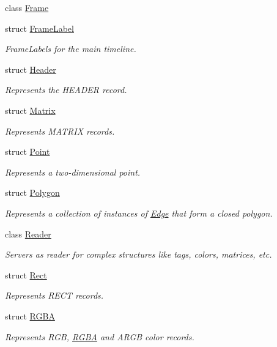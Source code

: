 \begin{DoxyCompactItemize}
class \hyperlink{classjswf_1_1flash_1_1_frame}{Frame}
\item 
struct \hyperlink{structjswf_1_1flash_1_1_frame_label}{Frame\+Label}
\begin{DoxyCompactList}\small\item\em Frame\+Labels for the main timeline. \end{DoxyCompactList}\item 
struct \hyperlink{structjswf_1_1flash_1_1_header}{Header}
\begin{DoxyCompactList}\small\item\em Represents the {\ttfamily H\+E\+A\+D\+E\+R} record. \end{DoxyCompactList}\item 
struct \hyperlink{structjswf_1_1flash_1_1_matrix}{Matrix}
\begin{DoxyCompactList}\small\item\em Represents {\ttfamily M\+A\+T\+R\+I\+X} records. \end{DoxyCompactList}\item 
struct \hyperlink{structjswf_1_1flash_1_1_point}{Point}
\begin{DoxyCompactList}\small\item\em Represents a two-\/dimensional point. \end{DoxyCompactList}\item 
struct \hyperlink{structjswf_1_1flash_1_1_polygon}{Polygon}
\begin{DoxyCompactList}\small\item\em Represents a collection of instances of \hyperlink{structjswf_1_1flash_1_1_edge}{Edge} that form a closed polygon. \end{DoxyCompactList}\item 
class \hyperlink{classjswf_1_1flash_1_1_reader}{Reader}
\begin{DoxyCompactList}\small\item\em Servers as reader for complex structures like tags, colors, matrices, etc. \end{DoxyCompactList}\item 
struct \hyperlink{structjswf_1_1flash_1_1_rect}{Rect}
\begin{DoxyCompactList}\small\item\em Represents {\ttfamily R\+E\+C\+T} records. \end{DoxyCompactList}\item 
struct \hyperlink{structjswf_1_1flash_1_1_r_g_b_a}{R\+G\+B\+A}
\begin{DoxyCompactList}\small\item\em Represents {\ttfamily R\+G\+B}, {\ttfamily \hyperlink{structjswf_1_1flash_1_1_r_g_b_a}{R\+G\+B\+A}} and {\ttfamily A\+R\+G\+B} color records. \end{DoxyCompactList}\item 

\end{DoxyCompactItemize}
